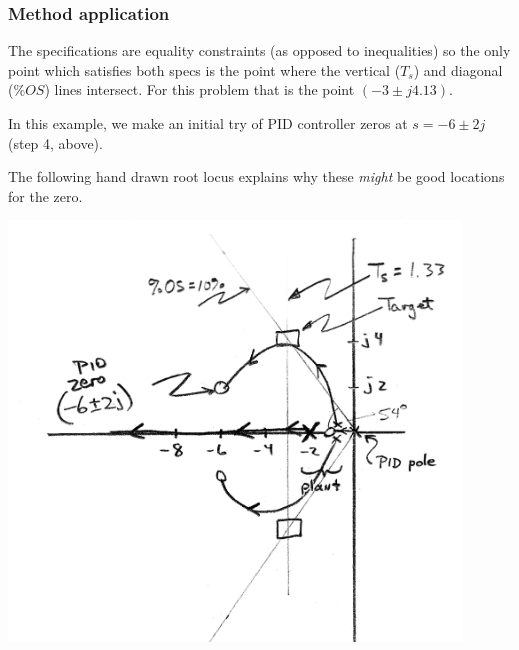 \begin{ExampleCont}

\subsubsection*{Method application}
The specifications are equality constraints (as opposed to inequalities) so the only point which satisfies both specs is the point where the vertical ($T_s$) and diagonal ($\%OS$) lines intersect.  For this problem that is the point $(-3 \pm j4.13)$.

In this example, we make an initial try of PID controller zeros at $s=-6\pm2j$ (step 4, above).

The following hand drawn root locus explains why these {\it might} be good locations for the
 zero.

\includegraphics[width=120mm]{figs09/00823a.png}

\end{ExampleCont}

